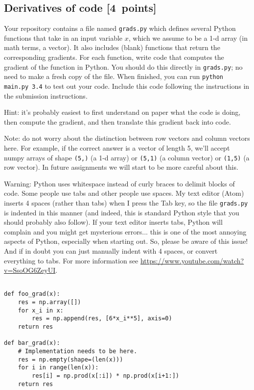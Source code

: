 \documentclass{article}
\newcommand{\blu}[1]{{\textcolor{blu}{#1}}}
\let\ask\blu
\newcommand\pts[1]{\textcolor{pointscolour}{[#1~points]}}
\begin{document}
  \subsection{Derivatives of code \pts{4}}

  Your repository contains a file named \texttt{grads.py} which defines several Python functions that take in an input variable $x$, which we assume to be a 1-d array (in math terms, a vector).
  It also includes (blank) functions that return the corresponding gradients.
  For each function, \ask{write code that computes the gradient of the function} in Python.
  You should do this directly in \texttt{grads.py}; no need to make a fresh copy of the file. When finished, you can run \texttt{python main.py 3.4} to test out your code. \ask{Include this code following the instructions in the submission instructions.}

  Hint: it's probably easiest to first understand on paper what the code is doing, then compute
  the gradient, and then translate this gradient back into code.

  Note: do not worry about the distinction between row vectors and column vectors here.
  For example, if the correct answer is a vector of length 5, we'll accept numpy arrays
  of shape \texttt{(5,)} (a 1-d array) or \texttt{(5,1)} (a column vector) or
  \texttt{(1,5)} (a row vector). In future assignments we will start to be more careful
  about this.

  Warning: Python uses whitespace instead of curly braces to delimit blocks of code.
  Some people use tabs and other people use spaces. My text editor (Atom) inserts 4 spaces (rather than tabs) when
  I press the Tab key, so the file \texttt{grads.py} is indented in this manner (and indeed, this is standard Python style that you should probably also follow). If your text editor inserts tabs,
  Python will complain and you might get mysterious errors... this is one of the most annoying aspects
  of Python, especially when starting out. So, please be aware of this issue! And if in doubt you can just manually
  indent with 4 spaces, or convert everything to tabs. For more information
  see \url{https://www.youtube.com/watch?v=SsoOG6ZeyUI}.

  \begin{verbatim}
  
def foo_grad(x):
    res = np.array([])
    for x_i in x:
        res = np.append(res, [6*x_i**5], axis=0)
    return res

def bar_grad(x):
    # Implementation needs to be here.
    res = np.empty(shape=(len(x)))
    for i in range(len(x)):
        res[i] = np.prod(x[:i]) * np.prod(x[i+1:])
    return res
  \end{verbatim}
\end{document}
